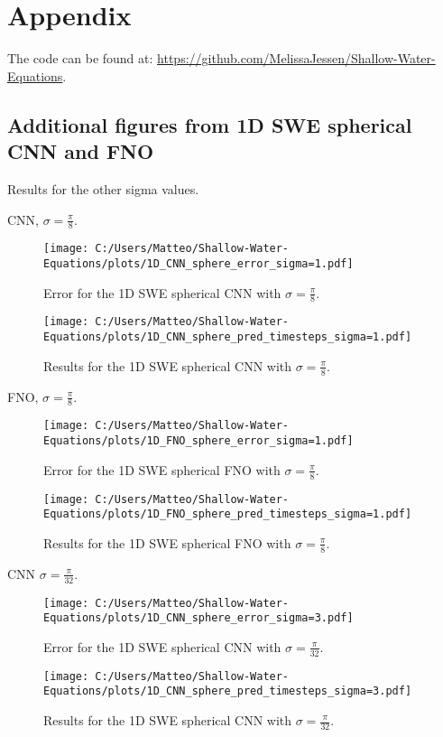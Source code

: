 \appendix
\chapter{Appendix}
The code can be found at: \url{https://github.com/MelissaJessen/Shallow-Water-Equations}.


\section{Additional figures from 1D SWE spherical CNN and FNO}\label{app:1D_SWE_spherical_CNN_FNO}
Results for the other sigma values.

CNN, $\sigma = \frac{\pi}{8}$.
\begin{figure}[H]
    \centering
    \texttt{[image: C:/Users/Matteo/Shallow-Water-Equations/plots/1D\_CNN\_sphere\_error\_sigma=1.pdf]}
    \caption{Error for the 1D SWE spherical CNN with $\sigma = \frac{\pi}{8}$.}
\end{figure}

\begin{figure}[H]
    \centering
    \texttt{[image: C:/Users/Matteo/Shallow-Water-Equations/plots/1D\_CNN\_sphere\_pred\_timesteps\_sigma=1.pdf]}
    \caption{Results for the 1D SWE spherical CNN with $\sigma = \frac{\pi}{8}$.}
\end{figure}

FNO, $\sigma = \frac{\pi}{8}$.
\begin{figure}[H]
    \centering
    \texttt{[image: C:/Users/Matteo/Shallow-Water-Equations/plots/1D\_FNO\_sphere\_error\_sigma=1.pdf]}
    \caption{Error for the 1D SWE spherical FNO with $\sigma = \frac{\pi}{8}$.}
\end{figure}

\begin{figure}[H]
    \centering
    \texttt{[image: C:/Users/Matteo/Shallow-Water-Equations/plots/1D\_FNO\_sphere\_pred\_timesteps\_sigma=1.pdf]}
    \caption{Results for the 1D SWE spherical FNO with $\sigma = \frac{\pi}{8}$.}
\end{figure}

CNN $\sigma = \frac{\pi}{32}$.
\begin{figure}[H]
    \centering
    \texttt{[image: C:/Users/Matteo/Shallow-Water-Equations/plots/1D\_CNN\_sphere\_error\_sigma=3.pdf]}
    \caption{Error for the 1D SWE spherical CNN with $\sigma = \frac{\pi}{32}$.}
\end{figure}

\begin{figure}[H]
    \centering
    \texttt{[image: C:/Users/Matteo/Shallow-Water-Equations/plots/1D\_CNN\_sphere\_pred\_timesteps\_sigma=3.pdf]}
    \caption{Results for the 1D SWE spherical CNN with $\sigma = \frac{\pi}{32}$.}
\end{figure}


